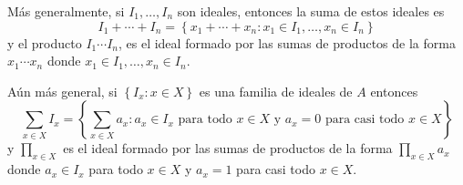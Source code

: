 Más generalmente, si $I_1,\dots,I_n$ son ideales, entonces la suma de estos ideales es
$$I_1+\cdots +I_n=\left\lbrace x_1+\cdots+x_n: x_1\in I_1,\dots, x_n\in I_n\right\rbrace$$
y el producto $I_1\cdots I_n$, es el ideal formado por las sumas de productos de la forma $x_1\cdots x_n$ donde $x_1\in I_1,\dots,x_n\in I_n$.

Aún más general, si $\left\lbrace I_x : x\in X\right\rbrace$ es una familia de ideales de $A$ entonces
$$\sum_{x\in X}I_x=\left\lbrace \sum_{x\in X}a_x : a_x \in I_x\text{ para todo }x\in X\text{ y }a_x=0\text{ para casi todo }x\in X\right\rbrace$$
y $\prod_{x\in X}$ es el ideal formado por las sumas de productos de la forma $\prod_{x\in X}a_x$ donde $a_x\in I_x$ para todo $x\in X$ y $a_x=1$ para casi todo $x\in X$.